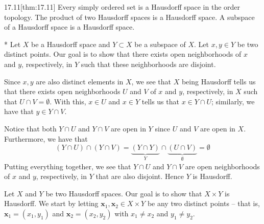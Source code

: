 \begin{thmBox}{17.11}[thm:17.11]
    Every simply ordered set is a Hausdorff space in the order topology.
    The product of two Hausdorff spaces is a Hausdorff space. 
    A subspace of a Hausdorff space is a Hausdorff space.

    \baseRule

    \begin{proofBox}*
        Let \( X \) be a Hausdorff space and \( Y \subset X \) be a subspace of 
        \( X \).
        Let \( x, y \in Y \) be two distinct points.
        Our goal is to show that there exists open neighborhoods of \( x \) and 
        \( y \), respectively, in \( Y \) such that these neighborhoods are 
        disjoint.

        \baseSkip

        Since \( x, y \) are also distinct elements in \( X \), we see that \( X \) 
        being Hausdorff tells us that there exists open neighborhoods 
        \( U \) and \( V \) of \( x \) and \( y \), respectively,
        in \( X \) such that \( U \cap V = \emptyset \).
        With this, \( x \in U \) and \( x \in Y \) tells us 
        that \( x \in Y \cap U \); similarly, we have that \( y \in Y 
        \cap V \).

        \baseSkip

        Notice that both \( Y \cap U \) and \( Y \cap V \) are 
        open in \( Y \) since \( U \) and \( V \) are open in \( X \). 
        Furthermore, we have that 
        \begin{equation*}
            ( Y \cap U ) \cap ( Y \cap V )
            =
            \underbrace{ ( Y \cap Y ) }_{ Y } \cap 
            \underbrace{ ( U \cap V ) }_{ \emptyset }
            =
            \emptyset
        \end{equation*}
        Putting everything together, we see that \( Y \cap U \) and \( Y \cap V \)
        are open neighborhoods of \( x \) and \( y \), respectively, in \( Y \) 
        that are also disjoint.
        Hence \( Y \) is Hausdorff.

        \baseSkip 


        Let \( X \) and \( Y \) be two Hausdorff spaces.
        Our goal is to show that \( X \times Y \) is Hausdorff.
        We start by letting \( \mathbf{x}_{ 1 }, \mathbf{x}_{ 2 } \in X \times 
        Y \)
        be any two distinct points -- that is, 
        \( \mathbf{x}_{ 1 } = ( x_{ 1 }, y_{ 1 } ) \) and \( \mathbf{x}_{ 2 }
        = ( x_{ 2 }, y_{ 2 } ) \) with \( x_{ 1 } \neq x_{ 2 } \) and 
        \( y_{ 1 } \neq y_{ 2 } \).


\end{proofBox}
\end{thmBox}

